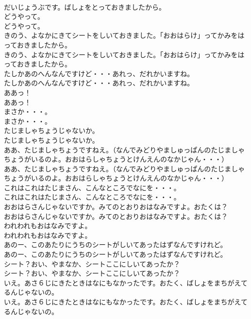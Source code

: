 \documentclass[8pt]{extreport}
\begin{document}
\begin{CJK}{UTF8}{min}
\\	だいじょうぶです。ばしょをとっておきましたから。
\\	どうやって。
\\	どうやって。
\\	きのう、よなかにきてシートをしいておきました。「おおはらけ」ってかみをはっておきましたから。
\\	きのう、よなかにきてシートをしいておきました。「おおはらけ」ってかみをはっておきましたから。
\\	たしかあのへんなんですけど・・・あれっ、だれかいますね。
\\	たしかあのへんなんですけど・・・あれっ、だれかいますね。
\\	ああっ！
\\	ああっ！
\\	まさか・・・。
\\	まさか・・・。
\\	たじましゃちょうじゃないか。
\\	たじましゃちょうじゃないか。
\\	ああ、たじましゃちょうですねえ。（なんでみどりやましゅっぱんのたじましゃちょうがいるのよ。おおはらしゃちょうとけんえんのなかじゃん・・・）
\\	ああ、たじましゃちょうですねえ。（なんでみどりやましゅっぱんのたじましゃちょうがいるのよ。おおはらしゃちょうとけんえんのなかじゃん・・・）
\\	これはこれはたじまさん、こんなところでなにを・・・。
\\	これはこれはたじまさん、こんなところでなにを・・・。
\\	おおはらさんじゃないですか。みてのとおりおはなみですよ。おたくは？
\\	おおはらさんじゃないですか。みてのとおりおはなみですよ。おたくは？
\\	われわれもおはなみですよ。
\\	われわれもおはなみですよ。
\\	あのー、このあたりにうちのシートがしいてあったはずなんですけれど。
\\	あのー、このあたりにうちのシートがしいてあったはずなんですけれど。
\\	シート？おい、やまなか、シートここにしいてあったか？
\\	シート？おい、やまなか、シートここにしいてあったか？
\\	いえ。あさ６じにきたときはなにもなかったです。おたく、ばしょをまちがえてるんじゃないの。
\\	いえ。あさ６じにきたときはなにもなかったです。おたく、ばしょをまちがえてるんじゃないの。

\end{CJK}
\end{document}
